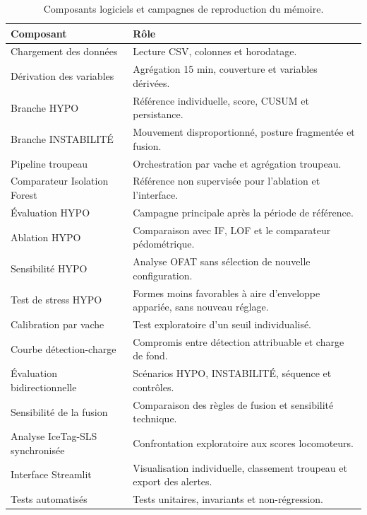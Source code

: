 \begin{table}[H]
  \centering
  \caption{Composants logiciels et campagnes de reproduction du mémoire.}
  \label{tab:modules}
  \begingroup
  \small
  \setlength{\tabcolsep}{5pt}
  \begin{tabular}{p{}p{}}
    \toprule
    Composant & Rôle \\
    \midrule
    Chargement des données & Lecture CSV, colonnes et horodatage. \\
    Dérivation des variables & Agrégation 15 min, couverture et variables dérivées. \\
    Branche HYPO & Référence individuelle, score, CUSUM et persistance. \\
    Branche INSTABILITÉ & Mouvement disproportionné, posture fragmentée et fusion. \\
    Pipeline troupeau & Orchestration par vache et agrégation troupeau. \\
    Comparateur Isolation Forest & Référence non supervisée pour l'ablation et l'interface. \\
    Évaluation HYPO & Campagne principale après la période de référence. \\
    Ablation HYPO & Comparaison avec IF, LOF et le comparateur pédométrique. \\
    Sensibilité HYPO & Analyse OFAT sans sélection de nouvelle configuration. \\
    Test de stress HYPO & Formes moins favorables à aire d'enveloppe appariée, sans nouveau réglage. \\
    Calibration par vache & Test exploratoire d'un seuil individualisé. \\
    Courbe détection-charge & Compromis entre détection attribuable et charge de fond. \\
    Évaluation bidirectionnelle & Scénarios HYPO, INSTABILITÉ, séquence et contrôles. \\
    Sensibilité de la fusion & Comparaison des règles de fusion et sensibilité technique. \\
    Analyse IceTag-SLS synchronisée & Confrontation exploratoire aux scores locomoteurs. \\
    Interface Streamlit & Visualisation individuelle, classement troupeau et export des alertes. \\
    Tests automatisés & Tests unitaires, invariants et non-régression. \\
    \bottomrule
  \end{tabular}
  \endgroup
\end{table}

